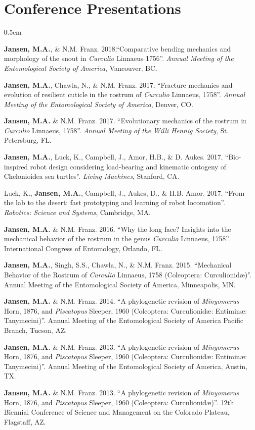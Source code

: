 \documentclass[12pt,a4paper]{article}
\begin{document}
\section*{Conference Presentations}
	\begin{description}
		\itemsep0.5em
		\item \textbf{Jansen, M.A.}, \& N.M. Franz. 2018.``Comparative bending mechanics and morphology of the snout in \textit{Curculio} Linnaeus 1756''. \textit{Annual Meeting of the Entomological Society of America}, Vancouver, BC.
		\item \textbf{Jansen, M.A.}, Chawla, N., \& N.M. Franz. 2017. ``Fracture mechanics and evolution of resilient cuticle in the rostrum of \textit{Curculio} Linnaeus, 1758''. \textit{Annual Meeting of the Entomological Society of America}, Denver, CO.
		\item \textbf{Jansen, M.A.} \& N.M. Franz. 2017. ``Evolutionary mechanics of the rostrum in \textit{Curculio} Linnaeus, 1758''. \textit{Annual Meeting of the Willi Hennig Society}, St. Petersburg, FL.
		\item \textbf{Jansen, M.A.}, Luck, K., Campbell, J., Amor, H.B., \& D. Aukes. 2017. ``Bio-inspired robot design considering load-bearing and kinematic ontogeny of Chelonioidea sea turtles''. \textit{Living Machines}, Stanford, CA.
		\item Luck, K., \textbf{Jansen, M.A.}, Campbell, J., Aukes, D., \& H.B. Amor. 2017. ``From the lab to the desert: fast prototyping and learning of robot locomotion''. \textit{Robotics: Science and Systems}, Cambridge, MA.
		\item \textbf{Jansen, M.A.} \& N.M. Franz. 2016. ``Why the long face? Insights into the mechanical behavior of the rostrum in the genus \textit{Curculio} Linnaeus, 1758''. International Congress of Entomology, Orlando, FL.
		\item \textbf{Jansen, M.A.}, Singh, S.S., Chawla, N., \& N.M. Franz. 2015. ``Mechanical Behavior of the Rostrum of \textit{Curculio} Linnaeus, 1758 (Coleoptera: Curculionid\ae)''. Annual Meeting of the Entomological Society of America, Minneapolis, MN.
		\item \textbf{Jansen, M.A.} \& N.M. Franz. 2014. ``A phylogenetic revision of \textit{Minyomerus} Horn, 1876, and \textit{Piscatopus} Sleeper, 1960 (Coleoptera: Curculionid\ae: Entimin\ae: Tanymecini)''. Annual Meeting of the Entomological Society of America Pacific Branch, Tucson, AZ.
		\item \textbf{Jansen, M.A.} \& N.M. Franz. 2013. ``A phylogenetic revision of \textit{Minyomerus} Horn, 1876, and \textit{Piscatopus} Sleeper, 1960 (Coleoptera: Curculionid\ae: Entimin\ae: Tanymecini)''. Annual Meeting of the Entomological Society of America, Austin, TX.
		\item \textbf{Jansen, M.A.} \& N.M. Franz. 2013. ``A phylogenetic revision of \textit{Minyomerus} Horn, 1876, and \textit{Piscatopus} Sleeper, 1960 (Coleoptera: Curculionid\ae)''. 12th Biennial Conference of Science and Management on the Colorado Plateau, Flagstaff, AZ.
	\end{description}
\end{document}
